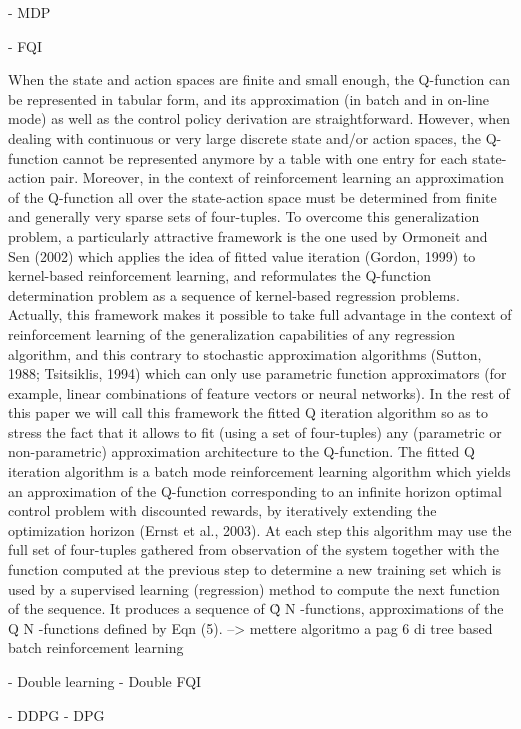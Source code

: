- MDP

- FQI

	When the state and action spaces are finite and small enough, the Q-function can be represented in tabular form, and its approximation (in batch and in on-line mode) as well as the control policy derivation are straightforward. However, when dealing with continuous or very large discrete state and/or action spaces, the Q-function cannot be represented anymore by a table with one entry for each state-action pair. Moreover, in the context of reinforcement learning an approximation of the Q-function all over the state-action space must be determined from finite and generally very sparse sets of four-tuples.
To overcome this generalization problem, a particularly attractive framework is the one used by Ormoneit and Sen (2002) which applies the idea of fitted value iteration (Gordon, 1999) to kernel-based reinforcement learning, and reformulates the Q-function determination problem as a sequence of kernel-based regression problems. Actually, this framework makes it possible to take full advantage in the context of reinforcement learning of the generalization capabilities of any regression algorithm, and this contrary to stochastic approximation algorithms (Sutton, 1988; Tsitsiklis, 1994) which can only use parametric function approximators (for example, linear combinations of feature vectors or neural networks). In the rest of this paper we will call this framework the fitted Q iteration
algorithm so as to stress the fact that it allows to fit (using a set of four-tuples) any (parametric or non-parametric) approximation architecture to the Q-function.
The fitted Q iteration algorithm is a batch mode reinforcement learning algorithm which yields an approximation of the Q-function corresponding to an infinite horizon optimal control problem with discounted rewards, by iteratively extending the optimization horizon (Ernst et al., 2003).
At each step this algorithm may use the full set of four-tuples gathered from observation of the system together with the function computed at the previous step to determine a new training set which is used by a supervised learning (regression) method to compute the next function of the sequence. It produces a sequence of Q̂ N -functions, approximations of the Q N -functions defined by Eqn (5). --> mettere algoritmo a pag 6 di tree based batch reinforcement learning
	
	- Double learning
	- Double FQI

- DDPG
	- DPG
	
